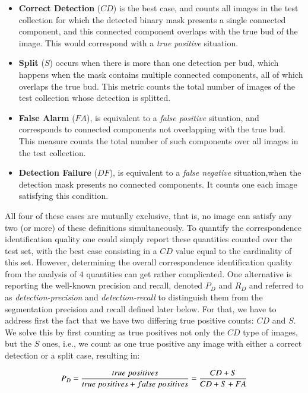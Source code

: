 \documentclass[a4paper,authoryear,review]{elsarticle}
\begin{document}
	\begin{itemize}
		\item \textbf{Correct Detection} ($CD$) is the best case, and counts all images in the test collection for which the detected binary mask presents a single connected component, and this connected component overlaps with the true bud of the image. This would correspond with a \emph{true positive} situation.
		\item \textbf{Split} ($S$) occurs when there is more than one detection per bud, which happens  when the mask contains multiple connected components, all of which overlaps the true bud. This metric counts the total number of images of the test collection whose detection is splitted.
		\item \textbf{False Alarm} ($FA$), is equivalent to a \emph{false positive} situation, and corresponds to connected components not overlapping with the true bud. This measure counts the total number of such components over all images in the test collection.
		\item \textbf{Detection Failure} ($DF$), is equivalent to a \emph{false negative} situation,when the detection mask presents no connected components. It counts one each image satisfying this condition.
	\end{itemize}
	
	All four of these cases are mutually exclusive, that is, no image can satisfy any two (or more) of these definitions simultaneously. To quantify the correspondence identification quality one could simply report these quantities counted over the test set, with the best case consisting in a $CD$ value equal to the cardinality of this set. However, determining the overall correspondence identification quality from the analysis of $4$ quantities can get rather complicated. 
	One alternative is reporting the well-known precision and recall, denoted $P_D$ and $R_D$ and referred to as  \emph{detection-precision} and \emph{detection-recall} to distinguish them from the segmentation precision and recall defined later below. For that, we have to address first the fact that  we have two differing true positive counts: $CD$ and $S$. We solve this by first counting as true positives not only the $CD$ type of images, but the $S$ ones, i.e., we count as one true positive any image with either a correct detection or a split case, resulting in:
	
	\begin{equation}
	P_D = \frac{true\ positives}{true\ positives+false\ positives} \\
	= \frac{CD+S}{CD+S+FA}
	\label{eq:detection-precision}
	\end{equation}
	
\end{document}
